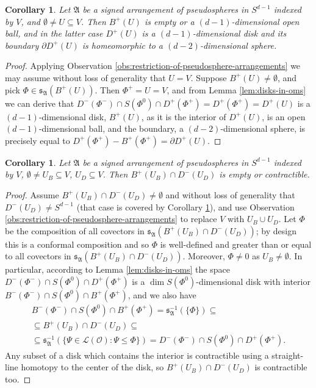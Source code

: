 \documentclass[a4paper,11pt,reqno, english]{amsart}
\newtheorem{corollary}[theorem]{Corollary}
\theoremstyle{definition}
\theoremstyle{remark}
\begin{document}
\begin{corollary}\label{crl:disks-in-oms}
    Let $\mathfrak{A}$ be a signed arrangement of pseudospheres in $S^{d-1}$ indexed by $V$, and $\emptyset\neq U\subseteq V$. Then $B^+(U)$ is empty or a $(d-1)$-dimensional open ball, and in the latter case $D^+(U)$ is a $(d-1)$-dimensional disk and its boundary $\partial D^+(U)$ is homeomorphic to a $(d-2)$-dimensional sphere.
\end{corollary}
\begin{proof}
    Applying Observation \ref{obs:restriction-of-pseudosphere-arrangements} we may assume without loss of generality that $U=V$. Suppose $B^+(U)\neq \emptyset$, and pick $\Phi\in\mathfrak{s}_\mathfrak{A}(B^+(U))$. Then $\Phi^+=U=V$, and from Lemma \ref{lem:disks-in-oms} we can derive that $D^-(\Phi^-)\cap S(\Phi^0)\cap D^+(\Phi^+)=D^+(\Phi^+)=D^+(U)$ is a $(d-1)$-dimensional disk, $B^+(U)$, as it is the interior of $D^+(U)$, is an open $(d-1)$-dimensional ball, and the boundary, a $(d-2)$-dimensional sphere, is precisely equal to $D^+(\Phi^+)-B^+(\Phi^+)=\partial D^+(U)$. 
\end{proof}
\begin{corollary}\label{crl:disk-with-partial-boundary-in-oms}
    Let $\mathfrak{A}$ be a signed arrangement of pseudospheres in $S^{d-1}$ indexed by $V$, $\emptyset\neq U_B\subseteq V$, $U_D\subseteq V$. Then $B^+(U_B)\cap D^-(U_D)$ is empty or contractible.
\end{corollary}
\begin{proof}    
    Assume $B^+(U_B)\cap D^-(U_D)\neq\emptyset$ and without loss of generality that $D^-(U_D)\neq S^{d-1}$ (that case is covered by Corollary \ref{crl:disks-in-oms}), and use Observation \ref{obs:restriction-of-pseudosphere-arrangements} to replace $V$ with $U_B\cup U_D$. Let $\Phi$ be the composition of all covectors in $\mathfrak{s}_\mathfrak{A}(B^+(U_B)\cap D^-(U_D))$; by design this is a conformal composition and so $\Phi$ is well-defined and greater than or equal to all covectors in $\mathfrak{s}_\mathfrak{A}(B^+(U_B)\cap D^-(U_D))$. Moreover, $\Phi\neq 0$ as $U_B\neq\emptyset$. In particular, according to Lemma \ref{lem:disks-in-oms} the space $D^-(\Phi^-)\cap S(\Phi^0)\cap D^+(\Phi^+)$ is a $\dim S(\Phi^0)$-dimensional disk with interior $B^-(\Phi^-)\cap S(\Phi^0)\cap B^+(\Phi^+)$, and we also have 
    \begin{multline*}
        B^-(\Phi^-)\cap S(\Phi^0)\cap B^+(\Phi^+)=\mathfrak{s}_\mathfrak{A}^{-1}(\{\Phi\})
        \subseteq\\\subseteq 
        B^+(U_B)\cap D^-(U_D)
        \subseteq\\\subseteq
        \mathfrak{s}_{\mathfrak{A}}^{-1}(\{\Psi\in\mathscr{L}(\mathscr{O}):\Psi\leq\Phi\})=D^-(\Phi^-)\cap S(\Phi^0)\cap D^+(\Phi^+).
    \end{multline*}
    Any subset of a disk which contains the interior is contractible using a straight-line homotopy to the center of the disk, so $B^+(U_B)\cap D^-(U_D)$ is contractible too.
\end{proof}
\end{document}
